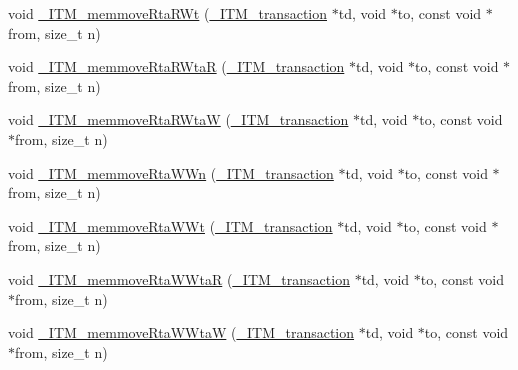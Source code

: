 \begin{DoxyCompactItemize}
\item 
void \hyperlink{libitm-5_813_0014_8cpp_ad67fff80abcc85541320321a01b806d9}{\-\_\-\-I\-T\-M\-\_\-memmove\-Rta\-R\-Wt} (\hyperlink{libitm_8h_a65d3a93d285fdbde408558d6b431abc8}{\-\_\-\-I\-T\-M\-\_\-transaction} $\ast$td, void $\ast$to, const void $\ast$from, size\-\_\-t n)
\item 
void \hyperlink{libitm-5_813_0014_8cpp_a6b3f7c57c1eab3748156256b6e0637c1}{\-\_\-\-I\-T\-M\-\_\-memmove\-Rta\-R\-Wta\-R} (\hyperlink{libitm_8h_a65d3a93d285fdbde408558d6b431abc8}{\-\_\-\-I\-T\-M\-\_\-transaction} $\ast$td, void $\ast$to, const void $\ast$from, size\-\_\-t n)
\item 
void \hyperlink{libitm-5_813_0014_8cpp_a02df312c9487f106612391331aa356f4}{\-\_\-\-I\-T\-M\-\_\-memmove\-Rta\-R\-Wta\-W} (\hyperlink{libitm_8h_a65d3a93d285fdbde408558d6b431abc8}{\-\_\-\-I\-T\-M\-\_\-transaction} $\ast$td, void $\ast$to, const void $\ast$from, size\-\_\-t n)
\item 
void \hyperlink{libitm-5_813_0014_8cpp_a522bff7c271fc2421f28119d5f96d742}{\-\_\-\-I\-T\-M\-\_\-memmove\-Rta\-W\-Wn} (\hyperlink{libitm_8h_a65d3a93d285fdbde408558d6b431abc8}{\-\_\-\-I\-T\-M\-\_\-transaction} $\ast$td, void $\ast$to, const void $\ast$from, size\-\_\-t n)
\item 
void \hyperlink{libitm-5_813_0014_8cpp_a1d60f94365761c517282a08ab86a97ae}{\-\_\-\-I\-T\-M\-\_\-memmove\-Rta\-W\-Wt} (\hyperlink{libitm_8h_a65d3a93d285fdbde408558d6b431abc8}{\-\_\-\-I\-T\-M\-\_\-transaction} $\ast$td, void $\ast$to, const void $\ast$from, size\-\_\-t n)
\item 
void \hyperlink{libitm-5_813_0014_8cpp_a0dcde68c93e5acb621fe3600c1fe9502}{\-\_\-\-I\-T\-M\-\_\-memmove\-Rta\-W\-Wta\-R} (\hyperlink{libitm_8h_a65d3a93d285fdbde408558d6b431abc8}{\-\_\-\-I\-T\-M\-\_\-transaction} $\ast$td, void $\ast$to, const void $\ast$from, size\-\_\-t n)
\item 
void \hyperlink{libitm-5_813_0014_8cpp_a7e39eef88200efc88a6cd89c12734f12}{\-\_\-\-I\-T\-M\-\_\-memmove\-Rta\-W\-Wta\-W} (\hyperlink{libitm_8h_a65d3a93d285fdbde408558d6b431abc8}{\-\_\-\-I\-T\-M\-\_\-transaction} $\ast$td, void $\ast$to, const void $\ast$from, size\-\_\-t n)
\end{DoxyCompactItemize}


